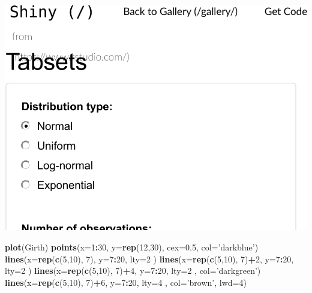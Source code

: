 \documentclass[]{book}
\newenvironment{Shaded}{\begin{snugshade}}{\end{snugshade}}
\newcommand{\KeywordTok}[1]{\textcolor[rgb]{0.13,0.29,0.53}{\textbf{#1}}}
\newcommand{\DataTypeTok}[1]{\textcolor[rgb]{0.13,0.29,0.53}{#1}}
\newcommand{\DecValTok}[1]{\textcolor[rgb]{0.00,0.00,0.81}{#1}}
\newcommand{\FloatTok}[1]{\textcolor[rgb]{0.00,0.00,0.81}{#1}}
\newcommand{\StringTok}[1]{\textcolor[rgb]{0.31,0.60,0.02}{#1}}
\newcommand{\OperatorTok}[1]{\textcolor[rgb]{0.81,0.36,0.00}{\textbf{#1}}}
\newcommand{\NormalTok}[1]{#1}
\theoremstyle{definition}
\theoremstyle{definition}
\theoremstyle{definition}
\theoremstyle{remark}
\begin{document}
\includegraphics[width=0.5\linewidth]{Rcourse_files/figure-latex/unnamed-chunk-266-1}

\begin{Shaded}
\begin{Highlighting}[]
\KeywordTok{plot}\NormalTok{(Girth)}
\KeywordTok{points}\NormalTok{(}\DataTypeTok{x=}\DecValTok{1}\OperatorTok{:}\DecValTok{30}\NormalTok{, }\DataTypeTok{y=}\KeywordTok{rep}\NormalTok{(}\DecValTok{12}\NormalTok{,}\DecValTok{30}\NormalTok{), }\DataTypeTok{cex=}\FloatTok{0.5}\NormalTok{, }\DataTypeTok{col=}\StringTok{'darkblue'}\NormalTok{)}
\KeywordTok{lines}\NormalTok{(}\DataTypeTok{x=}\KeywordTok{rep}\NormalTok{(}\KeywordTok{c}\NormalTok{(}\DecValTok{5}\NormalTok{,}\DecValTok{10}\NormalTok{), }\DecValTok{7}\NormalTok{), }\DataTypeTok{y=}\DecValTok{7}\OperatorTok{:}\DecValTok{20}\NormalTok{, }\DataTypeTok{lty=}\DecValTok{2}\NormalTok{ )}
\KeywordTok{lines}\NormalTok{(}\DataTypeTok{x=}\KeywordTok{rep}\NormalTok{(}\KeywordTok{c}\NormalTok{(}\DecValTok{5}\NormalTok{,}\DecValTok{10}\NormalTok{), }\DecValTok{7}\NormalTok{)}\OperatorTok{+}\DecValTok{2}\NormalTok{, }\DataTypeTok{y=}\DecValTok{7}\OperatorTok{:}\DecValTok{20}\NormalTok{, }\DataTypeTok{lty=}\DecValTok{2}\NormalTok{ )}
\KeywordTok{lines}\NormalTok{(}\DataTypeTok{x=}\KeywordTok{rep}\NormalTok{(}\KeywordTok{c}\NormalTok{(}\DecValTok{5}\NormalTok{,}\DecValTok{10}\NormalTok{), }\DecValTok{7}\NormalTok{)}\OperatorTok{+}\DecValTok{4}\NormalTok{, }\DataTypeTok{y=}\DecValTok{7}\OperatorTok{:}\DecValTok{20}\NormalTok{, }\DataTypeTok{lty=}\DecValTok{2}\NormalTok{ , }\DataTypeTok{col=}\StringTok{'darkgreen'}\NormalTok{)}
\KeywordTok{lines}\NormalTok{(}\DataTypeTok{x=}\KeywordTok{rep}\NormalTok{(}\KeywordTok{c}\NormalTok{(}\DecValTok{5}\NormalTok{,}\DecValTok{10}\NormalTok{), }\DecValTok{7}\NormalTok{)}\OperatorTok{+}\DecValTok{6}\NormalTok{, }\DataTypeTok{y=}\DecValTok{7}\OperatorTok{:}\DecValTok{20}\NormalTok{, }\DataTypeTok{lty=}\DecValTok{4}\NormalTok{ , }\DataTypeTok{col=}\StringTok{'brown'}\NormalTok{, }\DataTypeTok{lwd=}\DecValTok{4}\NormalTok{)}
\end{Highlighting}
\end{Shaded}
\end{document}
